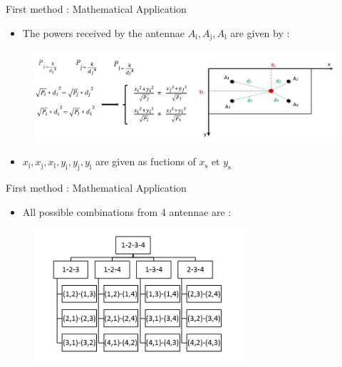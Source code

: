 \documentclass[utf8,compress]{beamer}
\begin{document}
\begin{frame}[containsverbatim]{First method : Mathematical Application}
 \begin{itemize}
    \item The powers received by the antennae $A_\text{i}, A_\text{j}, A_\text{l}$ are given by : 
    \end{itemize}   
    \begin{figure}[h]
        \includegraphics[width=\textwidth]{formule.png}
    \end{figure}
 \begin{itemize}
    \item  $x_\text{i}, x_\text{j}, x_\text{l}, y_\text{i}, y_\text{j}, y_\text{l} $ are given as fuctions of $x_\text{s}$  et  $y_\text{s}$
    \end{itemize}   
\end{frame}

\begin{frame}[containsverbatim]{First method : Mathematical Application }
 \begin{itemize}
    \item All possible combinations from 4 antennae are :
    \end{itemize}  
    \begin{figure}[h]
        \includegraphics[width=0.7\textwidth]{combinaison.png}
    \end{figure}
\end{frame}
\end{document}
